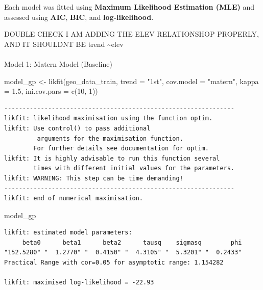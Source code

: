 \documentclass[
  11pt,
]{article}
\makeatletter
\let\oldparagraph\paragraph
\renewcommand{\paragraph}{
    \@ifstar
      \xxxParagraphStar
      \xxxParagraphNoStar
  }
\newcommand{\xxxParagraphStar}[1]{\oldparagraph*{#1}\mbox{}}
\newcommand{\xxxParagraphNoStar}[1]{\oldparagraph{#1}\mbox{}}
\newenvironment{Shaded}{\begin{snugshade}}{\end{snugshade}}
\newcommand{\AttributeTok}[1]{\textcolor[rgb]{0.40,0.45,0.13}{#1}}
\newcommand{\DecValTok}[1]{\textcolor[rgb]{0.68,0.00,0.00}{#1}}
\newcommand{\FloatTok}[1]{\textcolor[rgb]{0.68,0.00,0.00}{#1}}
\newcommand{\FunctionTok}[1]{\textcolor[rgb]{0.28,0.35,0.67}{#1}}
\newcommand{\NormalTok}[1]{\textcolor[rgb]{0.00,0.23,0.31}{#1}}
\newcommand{\OtherTok}[1]{\textcolor[rgb]{0.00,0.23,0.31}{#1}}
\newcommand{\StringTok}[1]{\textcolor[rgb]{0.13,0.47,0.30}{#1}}
\makeatother
\begin{document}
Each model was fitted using \textbf{Maximum Likelihood Estimation (MLE)}
and assessed using \textbf{AIC}, \textbf{BIC}, and
\textbf{log-likelihood}.

DOUBLE CHECK I AM ADDING THE ELEV RELATIONSHOP PROPERLY, AND IT SHOULDNT
BE trend \textasciitilde elev

\paragraph{Model 1: Matern Model
(Baseline)}\label{model-1-matern-model-baseline}

\begin{Shaded}
\begin{Highlighting}[]
\NormalTok{model\_gp }\OtherTok{\textless{}{-}} \FunctionTok{likfit}\NormalTok{(geo\_data\_train, }\AttributeTok{trend =} \StringTok{"1st"}\NormalTok{, }\AttributeTok{cov.model =} \StringTok{"matern"}\NormalTok{, }\AttributeTok{kappa =} \FloatTok{1.5}\NormalTok{, }\AttributeTok{ini.cov.pars =} \FunctionTok{c}\NormalTok{(}\DecValTok{10}\NormalTok{, }\DecValTok{1}\NormalTok{))}
\end{Highlighting}
\end{Shaded}

\begin{verbatim}
---------------------------------------------------------------
likfit: likelihood maximisation using the function optim.
likfit: Use control() to pass additional
         arguments for the maximisation function.
        For further details see documentation for optim.
likfit: It is highly advisable to run this function several
        times with different initial values for the parameters.
likfit: WARNING: This step can be time demanding!
---------------------------------------------------------------
likfit: end of numerical maximisation.
\end{verbatim}

\begin{Shaded}
\begin{Highlighting}[]
\NormalTok{model\_gp}
\end{Highlighting}
\end{Shaded}

\begin{verbatim}
likfit: estimated model parameters:
     beta0      beta1      beta2      tausq    sigmasq        phi 
"152.5280" "  1.2770" "  0.4150" "  4.3105" "  5.3201" "  0.2433" 
Practical Range with cor=0.05 for asymptotic range: 1.154282

likfit: maximised log-likelihood = -22.93
\end{verbatim}
\end{document}
